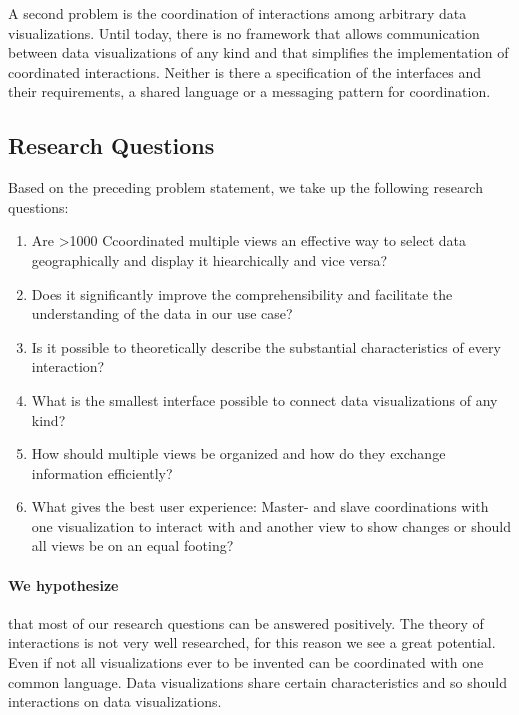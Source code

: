 \documentclass{article}
\newcommand\hmm[1]{\ifnum\ifhmode\spacefactor\else2000\fi>1000 \uppercase{#1}\else#1\fi}
\newcommand{\cmvs}{\hmm{c}oordinated multiple views}
\begin{document}
A second problem is the coordination of interactions among arbitrary data visualizations.
Until today, there is no framework that allows communication between data visualizations of any kind and that simplifies the implementation of coordinated interactions.
Neither is there a specification of the interfaces and their requirements, a shared language or a messaging pattern for coordination. 

\subsection{Research Questions}

Based on the preceding problem statement, we take up the following research questions:
\begin{enumerate}
  \item
    Are \cmvs{} an effective way to select data geographically and display it hiearchically and vice versa?
  \item
    Does it significantly improve the comprehensibility and facilitate the understanding of the data in our use case? 
  \item
    Is it possible to theoretically describe the substantial characteristics of every interaction?
  \item
    What is the smallest interface possible to connect data visualizations of any kind?
  \item
    How should multiple views be organized and how do they exchange information efficiently?
  \item
    What gives the best user experience:
    Master- and slave coordinations with one visualization to interact with and another view to show changes or should all views be on an equal footing?
\end{enumerate}


\paragraph{We hypothesize} that most of our research questions can be answered positively.
The theory of interactions is not very well researched, for this reason we see a great potential.
Even if not all visualizations ever to be invented can be coordinated with one common language.
Data visualizations share certain characteristics and so should interactions on data visualizations.  


\end{document}
